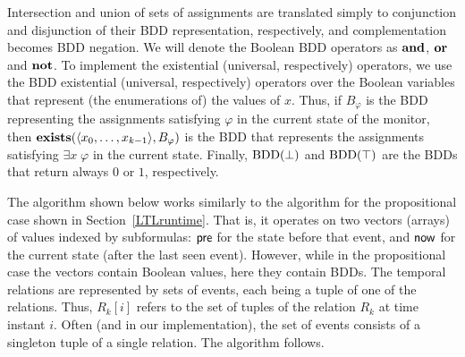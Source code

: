 Intersection and union of sets of assignments are translated simply
to conjunction and disjunction of their BDD representation,
respectively, and complementation
becomes BDD negation. We will denote
the Boolean BDD operators as $\mathbf{and}$, $\mathbf{or}$ and $\mathbf{not}$.
To implement the existential (universal, respectively) operators, 
we use the BDD existential (universal, respectively) operators over
the Boolean variables that represent (the enumerations of) the values of $x$. 
Thus, if $B_{\varphi}$ is the BDD representing
the assignments satisfying $\varphi$ in
the current state of the monitor, then 
$\mathbf{exists} (\langle x_0,\ldots,x_{k-1} \rangle, B_{\varphi})$
is the BDD that represents the assignments satisfying $\exists x \; \varphi$ in the current
state.
Finally, $\mathrm{BDD}(\bot)$ and $\mathrm{BDD}(\top)$  are the BDDs that return always
$0$ or $1$, respectively.


The algorithm shown below works similarly to the algorithm for the 
propositional case shown in
Section~\ref{LTLruntime}. That is,
it operates on two vectors (arrays) of values indexed by subformulas: 
$\mathsf{pre}$ for the state before that event, and
$\mathsf{now}$ for the current
state (after the last seen event).
However, while in the propositional case the vectors contain Boolean values, here
they contain BDDs. The temporal relations are
represented by
sets of events, each being a tuple of one of the relations. Thus, $R_k [ i ]$ refers to the set
of tuples of the relation $R_k$ at time instant $i$. Often (and in our implementation), the set of events consists of a singleton tuple of a single relation.
The algorithm follows.


